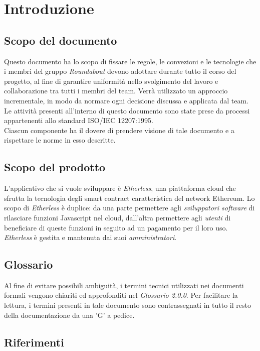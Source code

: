 \section{Introduzione}

\subsection{Scopo del documento}
Questo documento ha lo scopo di fissare le regole, le convezioni e le tecnologie che i membri del gruppo \textit{Roundabout} devono adottare durante tutto il corso del progetto, al fine di garantire uniformità nello svolgimento del lavoro e collaborazione tra tutti i membri del team. 
Verrà utilizzato un approccio incrementale, in modo da normare ogni decisione discussa
e applicata dal team. Le attività presenti all'interno di questo documento sono state prese da processi appartenenti allo standard ISO/IEC 12207:1995. \\
Ciascun componente ha il dovere di prendere visione di tale documento e a rispettare le norme in esso descritte.

\subsection{Scopo del prodotto}
L'applicativo che si vuole sviluppare è \textit{Etherless}, una piattaforma cloud che sfrutta la tecnologia degli smart contract caratteristica del network Ethereum. Lo scopo di \textit{Etherless} è duplice: da una parte permettere agli \textit{sviluppatori software} di rilasciare funzioni Javascript nel cloud, dall'altra permettere agli \textit{utenti} di beneficiare di queste funzioni in seguito ad un pagamento per il loro uso. 
\textit{Etherless} è gestita e mantenuta dai suoi \textit{amministratori}.

\subsection{Glossario}
Al fine di evitare possibili ambiguità, i termini tecnici utilizzati nei documenti formali vengono chiariti ed approfonditi nel \textit{Glossario 2.0.0}. Per facilitare la lettura, i termini presenti in tale documento sono contrassegnati in tutto il resto della documentazione da una 'G' a pedice.

\subsection{Riferimenti}

